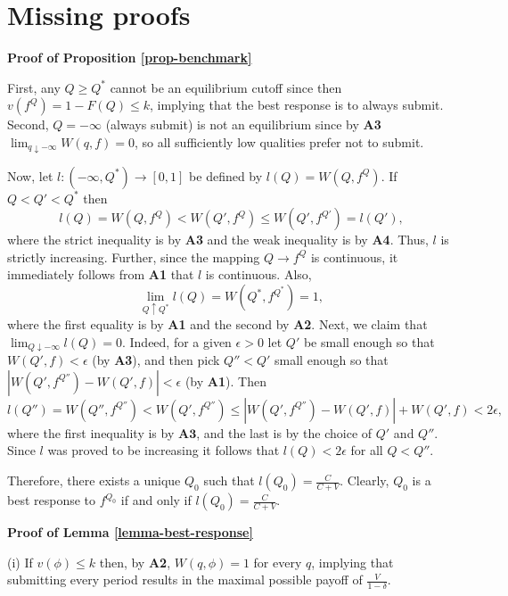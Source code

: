 \documentclass[12pt]{article}
\theoremstyle{plain}
\theoremstyle{definition}
\theoremstyle{remark}
\begin{document}




\appendix

\section{Missing proofs}\label{sec-proofs}

\noindent \textbf{Proof of Proposition \ref{prop-benchmark}}

First, any $Q\ge Q^*$ cannot be an equilibrium cutoff since then $v(f^Q)=1-F(Q)\le k$, implying that the best response is to always submit. Second, $Q=-\infty$ (always submit) is not an equilibrium since by \textbf{A3} $\lim_{q\downarrow -\infty} W(q,f)=0$, so all sufficiently low qualities prefer not to submit. 

Now, let $l:(-\infty,Q^*)\to [0,1]$ be defined by $l(Q)=W(Q,f^Q)$. If $Q<Q'<Q^*$ then 
$$l(Q)=W(Q,f^Q) < W(Q',f^Q) \le W(Q',f^{Q'}) = l(Q'),$$
where the strict inequality is by \textbf{A3} and the weak inequality is by \textbf{A4}. Thus, $l$ is strictly increasing. Further, since the mapping $Q\to f^Q$ is continuous, it immediately follows from \textbf{A1} that $l$ is continuous. Also, 
$$\lim_{Q\uparrow Q^*} l(Q) = W(Q^*,f^{Q^*}) = 1,$$
where the first equality is by \textbf{A1} and the second by \textbf{A2}. Next, we claim that $\lim_{Q\downarrow -\infty} l(Q) = 0$. Indeed, for a given $\epsilon>0$ let $Q'$ be small enough so that $W(Q',f)<\epsilon$ (by \textbf{A3}), and then pick $Q''<Q'$ small enough so that $|W(Q', f^{Q''})- W(Q',f)|<\epsilon$ (by \textbf{A1}). Then 
$$l(Q'') = W(Q'',f^{Q''}) < W(Q',f^{Q''}) \le  |W(Q', f^{Q''})- W(Q',f)| + W(Q',f) < 2\epsilon,$$
where the first inequality is by $\textbf{A3}$, and the last is by the choice of $Q'$ and $Q''$. Since $l$ was proved to be increasing it follows that $l(Q)<2\epsilon$ for all $Q< Q''$.    

Therefore, there exists a unique $Q_0$ such that $l(Q_0)=\frac{C}{C+V}$. Clearly, $Q_0$ is a best response to $f^{Q_0}$ if and only if $l(Q_0)=\frac{C}{C+V}$.

\bigskip

\noindent \textbf{Proof of Lemma \ref{lemma-best-response}}

\noindent (i) If $v(\phi)\le k$ then, by \textbf{A2}, $W(q,\phi)=1$ for every $q$, implying that submitting every period results in the maximal possible payoff of $\frac{V}{1-\delta}$.
\end{document}

